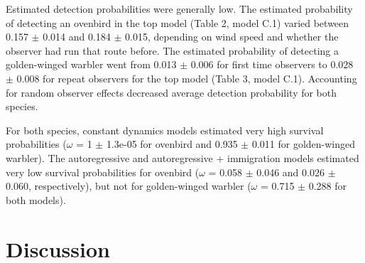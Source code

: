 \documentclass[12pt]{article}
\begin{document}
Estimated detection probabilities were generally low. The estimated probability
of detecting an ovenbird in the top model (Table 2, model C.1) varied between 0.157
$\pm$ 0.014 and 0.184 $\pm$ 0.015, depending on wind speed and whether the
observer had run that route before. The estimated probability of detecting a
golden-winged warbler went from 0.013 $\pm$ 0.006 for first time observers to 0.028 $\pm$ 0.008 for
repeat observers for the top model (Table 3, model C.1). Accounting for random
observer effects decreased average detection probability for both species.

For both species, constant dynamics models estimated very high
survival probabilities ($\omega$ = 1 $\pm$ 1.3e-05 for ovenbird and
0.935 $\pm$ 0.011 for
golden-winged warbler). The autoregressive and autoregressive + immigration
models estimated very low survival probabilities for ovenbird ($\omega$ =
0.058 $\pm$ 0.046 and 0.026 $\pm$ 0.060, respectively), 
but not for golden-winged warbler ($\omega$ = 0.715 $\pm$ 0.288 for both models).




\section{Discussion}

\end{document}

